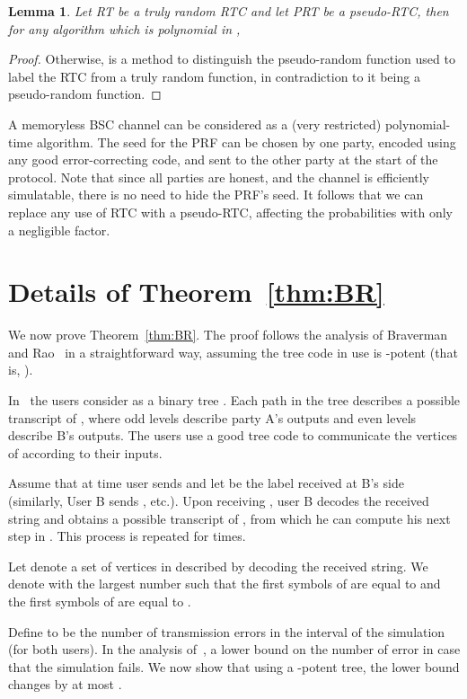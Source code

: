 \documentclass[ letterpaper, 11pt]{article}
\newtheorem{lemma}[theorem]{Lemma}
\newcommand{\potent}{potent\xspace}
\newcommand{\RTBC}{\textsf{RTC}\xspace}
\begin{document}
\begin{lemma}
Let RT be a truly random \RTBC and let PRT be a pseudo-\RTBC, then for
any  algorithm  which is polynomial in ,

\end{lemma}
\begin{proof}
Otherwise,  is a method to distinguish the
pseudo-random function  used to label the
\RTBC from a truly random function, in contradiction to it
being a pseudo-random function.
\end{proof}
A memoryless BSC channel can be considered as a (very restricted) polynomial-time algorithm.
The seed  for the PRF can be chosen by one party,
encoded using any good error-correcting code, and sent to the
other party at the start of the protocol.  Note that since all parties
are honest, and the channel is efficiently simulatable, there is no
need to hide the PRF's seed.
It follows that we can replace any use of \RTBC
with a pseudo-\RTBC, affecting the probabilities with only a negligible factor.




\section{Details of Theorem~\ref{thm:BR}}\label{app:BR}
We now prove Theorem~\ref{thm:BR}.
The proof follows the analysis of Braverman and Rao~\cite{BR10} in a straightforward way,
assuming the tree code in use is -potent (that is, ).



In~\cite{BR10} the users consider  as a binary tree . Each path in the tree describes a possible transcript of , where  odd levels describe party A's outputs and even levels describe B's outputs. The users use a good tree code to communicate the vertices of  according to their inputs.

Assume that at time  user  sends  and let  be the label received at B's side
(similarly, User B sends , etc.).
Upon receiving , user B decodes the received string  and obtains a possible transcript of , from which he can compute his next step in . This process is repeated for  times.

Let  denote a set of vertices in  described by decoding the received string. We denote with  the largest number such that the first  symbols of  are equal to  and the first  symbols of  are equal to .

Define  to be the number of transmission errors in the  interval of the simulation (for both users). In the analysis of~\cite{BR10}, a lower bound on the number of error in case that the simulation fails. We now show that using a -\potent tree, the lower bound
changes by at most .
\end{document}
